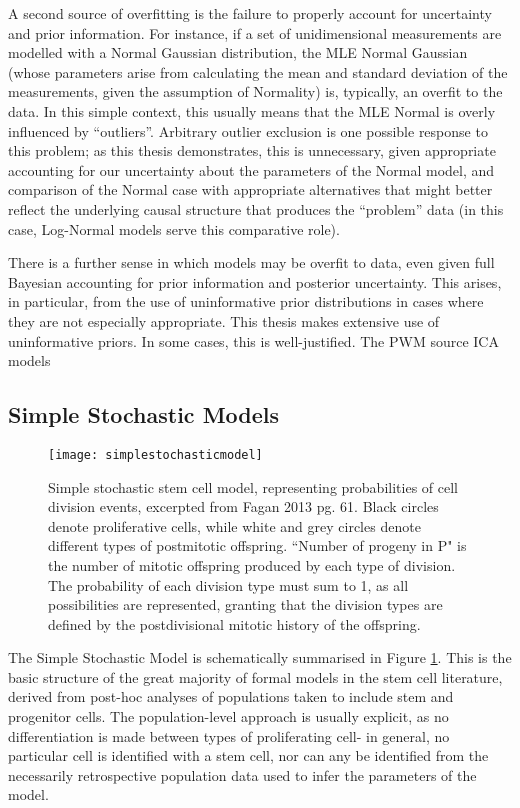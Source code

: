 A second source of overfitting is the failure to properly account for uncertainty and prior information. For instance, if a set of unidimensional measurements are modelled with a Normal Gaussian distribution, the MLE Normal Gaussian (whose parameters arise from calculating the mean and standard deviation of the measurements, given the assumption of Normality) is, typically, an overfit to the data. In this simple context, this usually means that the MLE Normal is overly influenced by ``outliers''. Arbitrary outlier exclusion is one possible response to this problem; as this thesis demonstrates, this is unnecessary, given appropriate accounting for our uncertainty about the parameters of the Normal model, and comparison of the Normal case with appropriate alternatives that might better reflect the underlying causal structure that produces the ``problem'' data (in this case, Log-Normal models serve this comparative role). 

There is a further sense in which models may be overfit to data, even given full Bayesian accounting for prior information and posterior uncertainty. This arises, in particular, from the use of uninformative prior distributions in cases where they are not especially appropriate. This thesis makes extensive use of uninformative priors. In some cases, this is well-justified. The PWM source ICA models 
 
\subsection{Simple Stochastic Models}
\label{SSM}

\begin{figure}
\texttt{[image: simplestochasticmodel]}
\centering
\caption{Simple stochastic stem cell model, representing probabilities of cell division events, excerpted from Fagan 2013 pg. 61. Black circles denote proliferative cells, while white and grey circles denote different types of postmitotic offspring. ``Number of progeny in P" is the number of mitotic offspring produced by each type of division. The probability of each division type must sum to 1, as all possibilities are represented, granting that the division types are defined by the postdivisional mitotic history of the offspring.}
\label{fig:SSM}
\end{figure}

The Simple Stochastic Model is schematically summarised in Figure \ref{fig:SSM}. This is the basic structure of the great majority of formal models in the stem cell literature, derived from post-hoc analyses of populations taken to include stem and progenitor cells. The population-level approach is usually explicit, as no differentiation is made between types of proliferating cell- in general, no particular cell is identified with a stem cell, nor can any be identified from the necessarily retrospective population data used to infer the parameters of the model. 


